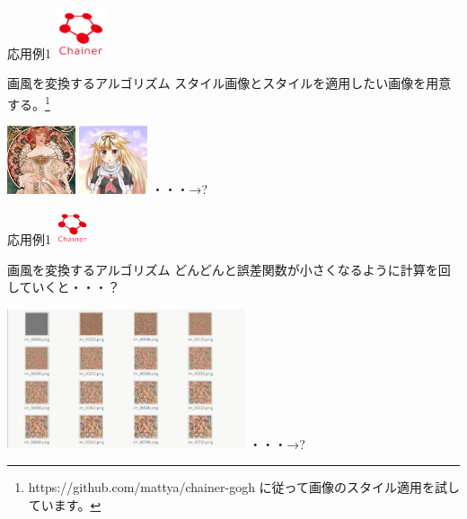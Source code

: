 \documentclass[12pt, unicode]{beamer}
\begin{document}
\begin{frame}{応用例1}
\includegraphics[clip,width=1.5cm]{image/chainer_logo.png}
\begin{block}{画風を変換するアルゴリズム}
スタイル画像とスタイルを適用したい画像を用意する。\footnote[frame]{https://github.com/mattya/chainer-gogh に従って画像のスタイル適用を試しています。}
\end{block}
\includegraphics[clip,width=2.0cm]{image/style_6.png}
\includegraphics[clip,width=2.0cm]{image/yuudachi_400x400.png}
・・・→\Large{?}
\end{frame}

\begin{frame}{応用例1}
\includegraphics[clip,width=1.0cm]{image/chainer_logo.png}
\begin{block}{画風を変換するアルゴリズム}
どんどんと誤差関数が小さくなるように計算を回していくと・・・？
\end{block}
\includegraphics[clip,width=7.0cm]{image/Screenshot1.png}
・・・→\Large{?}
\end{frame}
\end{document}
